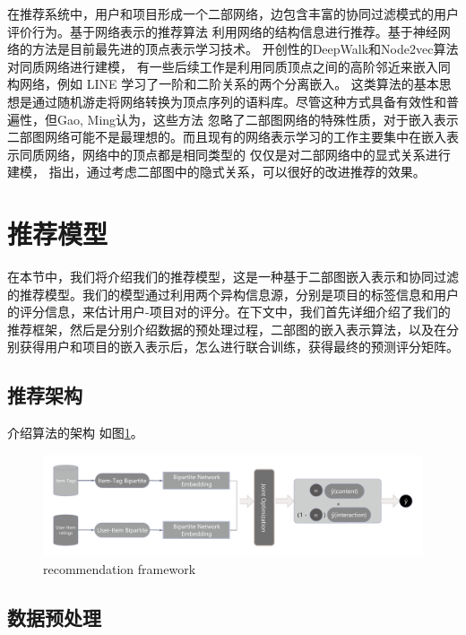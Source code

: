 \documentclass[lang=cn,11pt]{elegantpaper}
\begin{document}
在推荐系统中，用户和项目形成一个二部网络，边包含丰富的协同过滤模式的用户评价行为\cite{He2017a}。基于网络表示的推荐算法
利用网络的结构信息进行推荐\cite{Pongnumkul2018,Liu2009}。基于神经网络的方法是目前最先进的顶点表示学习技术。
开创性的DeepWalk\cite{Perozzi2014}和Node2vec\cite{Grover2016}算法对同质网络进行建模，
有一些后续工作是利用同质顶点之间的高阶邻近来嵌入同构网络，例如 LINE \cite{Tang2015}学习了一阶和二阶关系的两个分离嵌入。
这类算法的基本思想是通过随机游走将网络转换为顶点序列的语料库。尽管这种方式具备有效性和普遍性，但Gao, Ming\cite{Gao2018}认为，这些方法
忽略了二部图网络的特殊性质，对于嵌入表示二部图网络可能不是最理想的。而且现有的网络表示学习的工作主要集中在嵌入表示同质网络，网络中的顶点都是相同类型的
\cite{Grover2016,Perozzi2014,Liao2018}仅仅是对二部网络中的显式关系进行建模，
\cite{Yu2018,Pongnumkul2018}指出，通过考虑二部图中的隐式关系，可以很好的改进推荐的效果。

\section{推荐模型}

在本节中，我们将介绍我们的推荐模型，这是一种基于二部图嵌入表示和协同过滤的推荐模型。我们的模型通过利用两个异构信息源，分别是项目的标签信息和用户的评分信息，来估计用户-项目对的评分。在下文中，我们首先详细介绍了我们的推荐框架，然后是分别介绍数据的预处理过程，二部图的嵌入表示算法，以及在分别获得用户和项目的嵌入表示后，怎么进行联合训练，获得最终的预测评分矩阵。

 
\subsection{推荐架构}

介绍算法的架构 如图\ref{fig:framwork}。

\begin{figure}[t]
	\centering
	\includegraphics[width=1.0\textwidth]{imgs/framework.pdf}
	\caption{recommendation framework \label{fig:framwork}}
\end{figure}

\subsection{数据预处理}
\end{document}
